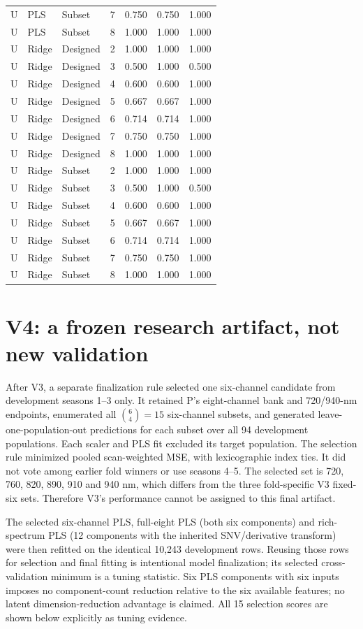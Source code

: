 \documentclass[10pt,a4paper]{article}
\begin{document}
\begin{landscape}
\begin{longtable}{lllrrrr}
U & PLS & Subset & 7 & 0.750 & 0.750 & 1.000 \\
U & PLS & Subset & 8 & 1.000 & 1.000 & 1.000 \\
U & Ridge & Designed & 2 & 1.000 & 1.000 & 1.000 \\
U & Ridge & Designed & 3 & 0.500 & 1.000 & 0.500 \\
U & Ridge & Designed & 4 & 0.600 & 0.600 & 1.000 \\
U & Ridge & Designed & 5 & 0.667 & 0.667 & 1.000 \\
U & Ridge & Designed & 6 & 0.714 & 0.714 & 1.000 \\
U & Ridge & Designed & 7 & 0.750 & 0.750 & 1.000 \\
U & Ridge & Designed & 8 & 1.000 & 1.000 & 1.000 \\
U & Ridge & Subset & 2 & 1.000 & 1.000 & 1.000 \\
U & Ridge & Subset & 3 & 0.500 & 1.000 & 0.500 \\
U & Ridge & Subset & 4 & 0.600 & 0.600 & 1.000 \\
U & Ridge & Subset & 5 & 0.667 & 0.667 & 1.000 \\
U & Ridge & Subset & 6 & 0.714 & 0.714 & 1.000 \\
U & Ridge & Subset & 7 & 0.750 & 0.750 & 1.000 \\
U & Ridge & Subset & 8 & 1.000 & 1.000 & 1.000 \\
\end{longtable}
\endgroup
\end{landscape}

\section{V4: a frozen research artifact, not new validation}
After V3, a separate finalization rule selected one six-channel candidate from development seasons 1--3 only. It retained P's eight-channel bank and 720/940-nm endpoints, enumerated all $\binom{6}{4}=15$ six-channel subsets, and generated leave-one-population-out predictions for each subset over all 94 development populations. Each scaler and PLS fit excluded its target population. The selection rule minimized pooled scan-weighted MSE, with lexicographic index ties. It did not vote among earlier fold winners or use seasons 4--5. The selected set is 720, 760, 820, 890, 910 and 940 nm, which differs from the three fold-specific V3 fixed-six sets. Therefore V3's performance cannot be assigned to this final artifact.

The selected six-channel PLS, full-eight PLS (both six components) and rich-spectrum PLS (12 components with the inherited SNV/derivative transform) were then refitted on the identical 10,243 development rows. Reusing those rows for selection and final fitting is intentional model finalization; its selected cross-validation minimum is a tuning statistic. Six PLS components with six inputs imposes no component-count reduction relative to the six available features; no latent dimension-reduction advantage is claimed. All 15 selection scores are shown below explicitly as tuning evidence.
\end{document}

